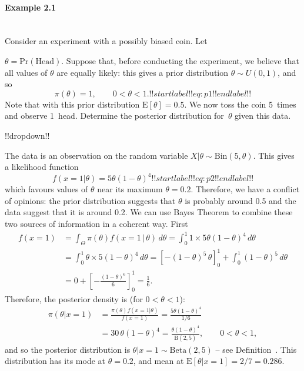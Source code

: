 \paragraph{Example 2.1}{~\\
Consider an experiment with a possibly biased coin. Let

$\theta=\text{Pr}(\mathrm{Head})$. Suppose that, before conducting the experiment, we believe that all values of $\theta$ are equally likely: this gives a prior distribution $\theta\sim U(0,1)$, and so
\begin{equation} 
\pi(\theta)=1,\quad\quad0<\theta<1.
!!startlabel!! eq:p1 !!endlabel!!
\end{equation}
Note that with this prior distribution $\text{E}[\theta]=0.5$. We now toss the coin 5~times and observe 1~head. Determine the posterior distribution for~$\theta$ given this data.

!!dropdown!!

The data is an observation on the random variable $X|\theta\sim
        \mathrm{Bin}(5,\theta)$. This gives a likelihood function
        \begin{equation}
        f(x=1|\theta)=5\theta(1-\theta)^4
        !!startlabel!! eq:p2 !!endlabel!!
        \end{equation}
        which favours values of $\theta$ near its maximum
        $\theta=0.2$. Therefore, we have a conflict of opinions: the prior
        distribution  suggests that $\theta$ is probably around
        0.5 and the data  suggest that it is around 0.2. We can
        use Bayes Theorem to combine these two sources of information in a
        coherent way. First
        \begin{align*}
        f(x=1) &=\int_\Theta\pi(\theta)f(x=1\, |\,\theta)\,d\theta = \int_0^1 1\times 5\theta(1-\theta)^4\,d\theta \\
        &=\int_0^1 \theta\times 5(1-\theta)^4\,d\theta =\left[-(1-\theta)^5\,\theta\right]^1_0
        +\int_0^1 (1-\theta)^5\,d\theta \\
        &=0 + \left[-\frac{(1-\theta)^6}{6}\right]^1_0 =\frac{1}{6}. 
        \end{align*}
        Therefore, the posterior density is (for $0<\theta<1$):
        \begin{align*}
        \pi(\theta|x=1)&=\frac{\pi(\theta)f(x=1|\theta)}{f(x=1)} =\frac{5\theta(1-\theta)^4}{1/6}\\
        &=30\,\theta(1-\theta)^4 =\frac{\theta(1-\theta)^4}{\mathrm{B}(2,5)},\quad\quad 0<\theta<1,
        \end{align*}
        and so the posterior distribution is $\theta|x=1\sim \mathrm{Beta}(2,5)$ -- see
        Definition~.  This distribution has its mode at
        $\theta=0.2$, and mean at $\text{E}[\theta|x=1]=2/7=0.286$.

}
